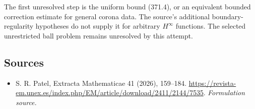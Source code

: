 \documentclass[11pt]{article}
\begin{document}
The first unresolved step is the uniform bound (371.4), or an
equivalent bounded correction estimate for general corona data.
The source's additional boundary-regularity hypotheses do not
supply it for arbitrary $H^\infty$ functions. The selected
unrestricted ball problem remains unresolved by this attempt.
\subsection{Sources}
\begin{itemize}
\item[S1]S. R. Patel, Extracta Mathematicae 41 (2026), 159–184.
\url{https://revista-em.unex.es/index.php/EM/article/download/2411/2144/7535}.
\textit{Formulation source.}
\end{itemize}
\end{document}
